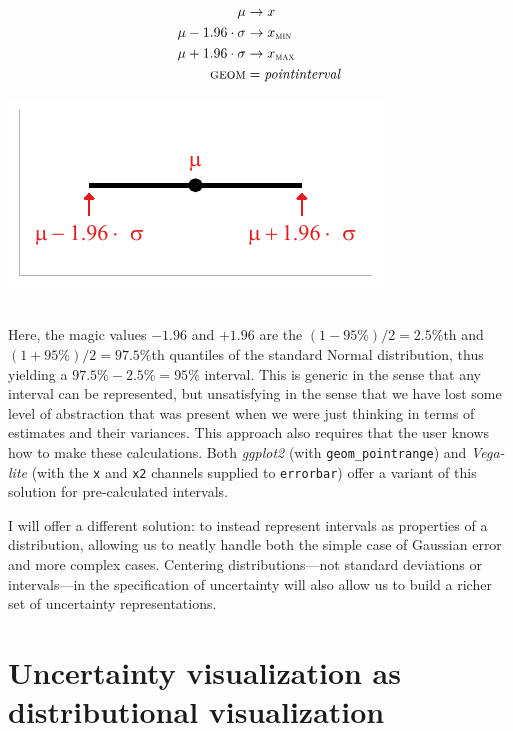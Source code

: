 \documentclass[journal]{vgtc}                     %
\newcommand{\equationfigure}[2]{%
\noindent
\begin{minipage}{.5\columnwidth}
\setlength{\abovedisplayskip}{0pt}
\setlength{\belowdisplayskip}{0pt}
#1\end{minipage}%
\begin{minipage}{.4\columnwidth}\centering #2 \end{minipage}%
\vspace{.5\belowdisplayskip}\\
}
\begin{document}
\equationfigure{
\begin{align*}
\mu &\rightarrow x\\
\mu - 1.96 \cdot \sigma &\rightarrow x_\textsc{min}\\
\mu + 1.96 \cdot \sigma &\rightarrow x_\textsc{max}\\
\textsc{geom} &= \mathit{pointinterval}
\end{align*}
}{\includegraphics[width=1.2\columnwidth]{figs/2-xmin_xmax_interval.pdf}}
Here, the magic values $-1.96$ and $+1.96$ are the $(1-95\%)/2 = 2.5\%$th and $(1+95\%)/2 = 97.5\%$th quantiles of the standard Normal distribution, thus yielding a $97.5\% - 2.5\% = 95\%$ interval. This is generic in the sense that any interval can be represented, but unsatisfying in the sense that we have lost some level of abstraction that was present when we were just thinking in terms of estimates and their variances. This approach also requires that the user knows how to make these calculations. Both \textit{ggplot2} (with \texttt{geom\_pointrange}) and \textit{Vega-lite} (with the \texttt{x} and \texttt{x2} channels supplied to \texttt{errorbar}) offer a variant of this solution for pre-calculated intervals. 

I will offer a different solution: to instead represent intervals as properties of a distribution, allowing us to neatly handle both the simple case of Gaussian error and more complex cases. Centering distributions---not standard deviations or intervals---in the specification of uncertainty will also allow us to build a richer set of uncertainty representations.

\section{Uncertainty visualization as\\distributional visualization}
\end{document}
